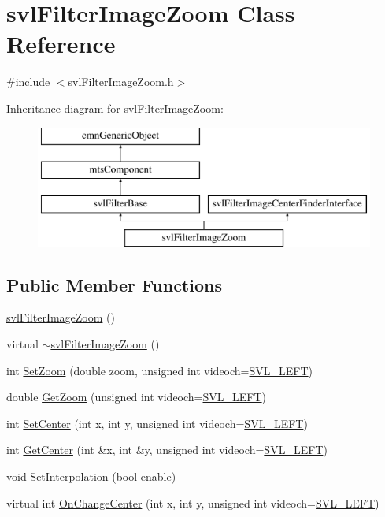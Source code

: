 \hypertarget{classsvl_filter_image_zoom}{\section{svl\-Filter\-Image\-Zoom Class Reference}
\label{classsvl_filter_image_zoom}
}


{\ttfamily \#include $<$svl\-Filter\-Image\-Zoom.\-h$>$}

Inheritance diagram for svl\-Filter\-Image\-Zoom\-:\begin{figure}[H]
\begin{center}
\leavevmode
\includegraphics[height=4.000000cm]{d6/dd0/classsvl_filter_image_zoom}
\end{center}
\end{figure}
\subsection*{Public Member Functions}
\begin{DoxyCompactItemize}
\item 
\hyperlink{classsvl_filter_image_zoom_aebd5c28f8f39d9feb64d955f6e77e270}{svl\-Filter\-Image\-Zoom} ()
\item 
virtual \hyperlink{classsvl_filter_image_zoom_a343d14b4c0e94f675705e81dea0d3ea0}{$\sim$svl\-Filter\-Image\-Zoom} ()
\item 
int \hyperlink{classsvl_filter_image_zoom_a4baf0459573f20a2db8ed3c41640376c}{Set\-Zoom} (double zoom, unsigned int videoch=\hyperlink{svl_definitions_8h_ab9fec7615f19c8df2919eebcab0b187f}{S\-V\-L\-\_\-\-L\-E\-F\-T})
\item 
double \hyperlink{classsvl_filter_image_zoom_a12b43f99c2f2a88613a78ab9d1c84029}{Get\-Zoom} (unsigned int videoch=\hyperlink{svl_definitions_8h_ab9fec7615f19c8df2919eebcab0b187f}{S\-V\-L\-\_\-\-L\-E\-F\-T})
\item 
int \hyperlink{classsvl_filter_image_zoom_a6c5bd854be6bd0f931ba7e3cf0279f55}{Set\-Center} (int x, int y, unsigned int videoch=\hyperlink{svl_definitions_8h_ab9fec7615f19c8df2919eebcab0b187f}{S\-V\-L\-\_\-\-L\-E\-F\-T})
\item 
int \hyperlink{classsvl_filter_image_zoom_aaa62c00e9c31a1f93c874dfa2251ec70}{Get\-Center} (int \&x, int \&y, unsigned int videoch=\hyperlink{svl_definitions_8h_ab9fec7615f19c8df2919eebcab0b187f}{S\-V\-L\-\_\-\-L\-E\-F\-T})
\item 
void \hyperlink{classsvl_filter_image_zoom_a98262bca1c64a6b2feca5f6f2ebe4185}{Set\-Interpolation} (bool enable)
\item 
virtual int \hyperlink{classsvl_filter_image_zoom_a293a0e896ac3eb1a9929fe0c3b128cdb}{On\-Change\-Center} (int x, int y, unsigned int videoch=\hyperlink{svl_definitions_8h_ab9fec7615f19c8df2919eebcab0b187f}{S\-V\-L\-\_\-\-L\-E\-F\-T})
\end{DoxyCompactItemize}

